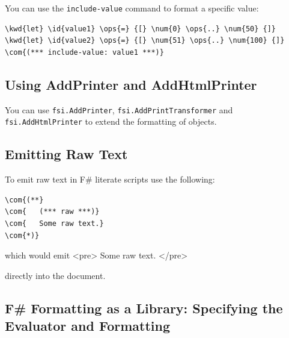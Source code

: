 \documentclass{article}
\newcommand{\id}[1]{\textcolor{black}{#1}}
\newcommand{\com}[1]{\textcolor{officegreen}{#1}}
\newcommand{\kwd}[1]{\textcolor{navy}{#1}}
\newcommand{\num}[1]{\textcolor{officegreen}{#1}}
\newcommand{\ops}[1]{\textcolor{purple}{#1}}
\begin{document}
You can use the \texttt{include-value} command to format a specific value:
\begin{Verbatim}[commandchars=\\\{\}]
\kwd{let} \id{value1} \ops{=} {[} \num{0} \ops{..} \num{50} {]}
\kwd{let} \id{value2} \ops{=} {[} \num{51} \ops{..} \num{100} {]}
\com{(*** include-value: value1 ***)}

\end{Verbatim}

\subsection*{Using AddPrinter and AddHtmlPrinter}



You can use \texttt{fsi.AddPrinter}, \texttt{fsi.AddPrintTransformer} and \texttt{fsi.AddHtmlPrinter} to extend the formatting of objects.
\subsection*{Emitting Raw Text}



To emit raw text in F\# literate scripts use the following:
\begin{Verbatim}[commandchars=\\\{\}]
\com{(**}
\com{	(*** raw ***)}
\com{	Some raw text.}
\com{*)}

\end{Verbatim}



which would emit
<pre>
Some raw text.
</pre>


directly into the document.
\subsection*{F\# Formatting as a Library:  Specifying the Evaluator and Formatting}
\end{document}
